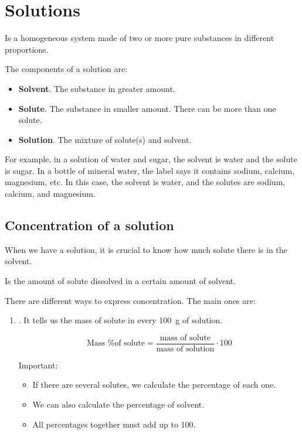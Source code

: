 \section{Solutions}

\begin{definition}[Solution]
    Is a homogeneous system made of two or more pure substances in different proportions.
\end{definition}

The components of a solution are:
\begin{itemize}
    \item \textbf{Solvent}. The substance in greater amount.
    \item \textbf{Solute}. The substance in smaller amount. There can be more than one solute.
    \item \textbf{Solution}. The mixture of solute(s) and solvent.
\end{itemize}

For example, in a solution of water and sugar, the solvent is water and the solute is sugar.
In a bottle of mineral water, the label says it contains sodium, calcium, magnesium, etc.
In this case, the solvent is water, and the solutes are sodium, calcium, and magnesium.

\subsection{Concentration of a solution}

When we have a solution, it is crucial to know how much solute there is in the solvent.

\begin{definition}[Concentration]
    Is the amount of solute dissolved in a certain amount of solvent.
\end{definition}

There are different ways to express concentration. The main ones are:

\begin{enumerate}[label=\numberballmDarkTeal]
\item {}.
It tells us the mass of solute in every \qty{100}{\g} of solution.

\begin{equation}
    \text{Mass \% of solute} = \dfrac{\text{mass of solute}}{\text{mass of solution}}\cdot 100
    \label{eq:porcentaje_masa}
\end{equation}

Important:
\begin{itemize}
    \item If there are several solutes, we calculate the percentage of each one.
    \item We can also calculate the percentage of solvent.
    \item All percentages together must add up to \num{100}.
\end{itemize}
\end{enumerate}

